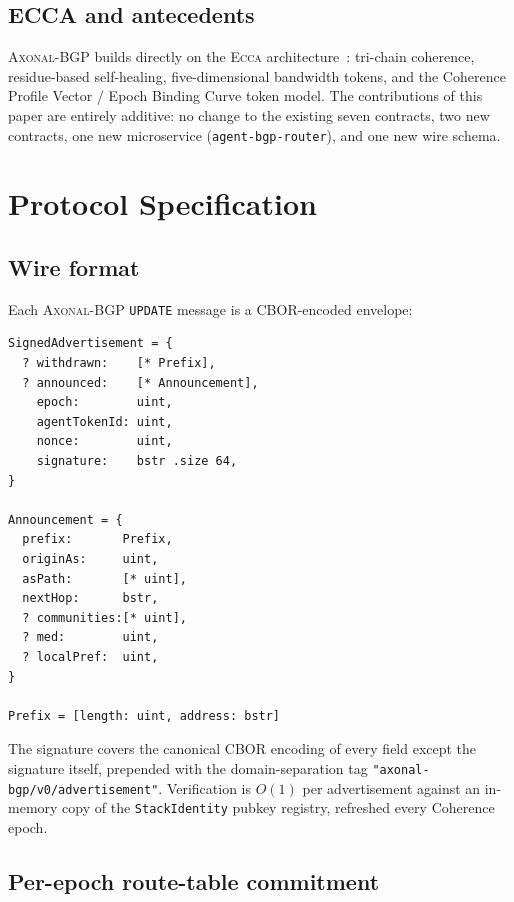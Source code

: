 \documentclass[11pt,twocolumn]{article}
\theoremstyle{definition}
\theoremstyle{plain}
\theoremstyle{remark}
\newcommand{\ecca}{\textsc{Ecca}}
\newcommand{\axonal}{\textsc{Axonal-BGP}}
\newcommand{\code}[1]{\texttt{#1}}
\begin{document}
\subsection{ECCA and antecedents}

\axonal{} builds directly on the \ecca{} architecture~\cite{ecca2026}: tri-chain coherence, residue-based self-healing, five-dimensional bandwidth tokens, and the Coherence Profile Vector / Epoch Binding Curve token model. The contributions of this paper are entirely additive: no change to the existing seven contracts, two new contracts, one new microservice (\code{agent-bgp-router}), and one new wire schema.

\section{Protocol Specification}\label{sec:protocol}

\subsection{Wire format}

Each \axonal{} \code{UPDATE} message is a CBOR-encoded envelope:

\begin{lstlisting}[language={},caption={\axonal{} signed-advertisement schema (CDDL).},label={lst:wire}]
SignedAdvertisement = {
  ? withdrawn:    [* Prefix],
  ? announced:    [* Announcement],
    epoch:        uint,
    agentTokenId: uint,
    nonce:        uint,
    signature:    bstr .size 64,
}

Announcement = {
  prefix:       Prefix,
  originAs:     uint,
  asPath:       [* uint],
  nextHop:      bstr,
  ? communities:[* uint],
  ? med:        uint,
  ? localPref:  uint,
}

Prefix = [length: uint, address: bstr]
\end{lstlisting}

The signature covers the canonical CBOR encoding of every field except the signature itself, prepended with the domain-separation tag \code{"axonal-bgp/v0/advertisement"}. Verification is $O(1)$ per advertisement against an in-memory copy of the \code{StackIdentity} pubkey registry, refreshed every Coherence epoch.

\subsection{Per-epoch route-table commitment}\label{ssec:commit}
\end{document}
